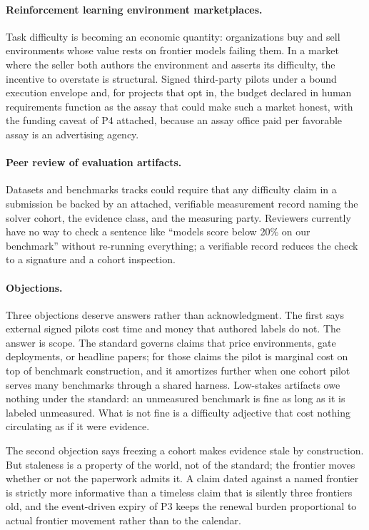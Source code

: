 \documentclass[11pt]{article}
\begin{document}
\paragraph{Reinforcement learning environment marketplaces.}
Task difficulty is becoming an economic quantity: organizations buy and sell environments whose value rests on frontier models failing them. In a market where the seller both authors the environment and asserts its difficulty, the incentive to overstate is structural. Signed third-party pilots under a bound execution envelope and, for projects that opt in, the budget declared in human requirements function as the assay that could make such a market honest, with the funding caveat of P4 attached, because an assay office paid per favorable assay is an advertising agency.

\paragraph{Peer review of evaluation artifacts.}
Datasets and benchmarks tracks could require that any difficulty claim in a submission be backed by an attached, verifiable measurement record naming the solver cohort, the evidence class, and the measuring party. Reviewers currently have no way to check a sentence like ``models score below 20\% on our benchmark'' without re-running everything; a verifiable record reduces the check to a signature and a cohort inspection.

\paragraph{Objections.}
Three objections deserve answers rather than acknowledgment. The first says external signed pilots cost time and money that authored labels do not. The answer is scope. The standard governs claims that price environments, gate deployments, or headline papers; for those claims the pilot is marginal cost on top of benchmark construction, and it amortizes further when one cohort pilot serves many benchmarks through a shared harness. Low-stakes artifacts owe nothing under the standard: an unmeasured benchmark is fine as long as it is labeled unmeasured. What is not fine is a difficulty adjective that cost nothing circulating as if it were evidence.

The second objection says freezing a cohort makes evidence stale by construction. But staleness is a property of the world, not of the standard; the frontier moves whether or not the paperwork admits it. A claim dated against a named frontier is strictly more informative than a timeless claim that is silently three frontiers old, and the event-driven expiry of P3 keeps the renewal burden proportional to actual frontier movement rather than to the calendar.
\end{document}
